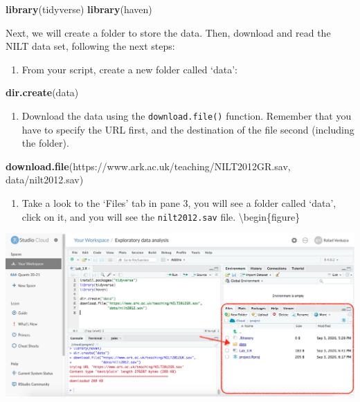 \documentclass[
]{book}
\newenvironment{Shaded}{\begin{snugshade}}{\end{snugshade}}
\newcommand{\FunctionTok}[1]{\textcolor[rgb]{0.13,0.29,0.53}{\textbf{#1}}}
\newcommand{\NormalTok}[1]{#1}
\newcommand{\StringTok}[1]{\textcolor[rgb]{0.31,0.60,0.02}{#1}}
\providecommand{\tightlist}{%
  \setlength{\itemsep}{0pt}\setlength{\parskip}{0pt}}
\begin{document}
\begin{Shaded}
\begin{Highlighting}[]
\FunctionTok{library}\NormalTok{(tidyverse)}
\FunctionTok{library}\NormalTok{(haven)}
\end{Highlighting}
\end{Shaded}

Next, we will create a folder to store the data. Then, download and read the NILT data set, following the next steps:

\begin{enumerate}
\def\labelenumi{\arabic{enumi}.}
\tightlist
\item
  From your script, create a new folder called `data':
\end{enumerate}

\begin{Shaded}
\begin{Highlighting}[]
\FunctionTok{dir.create}\NormalTok{(}\StringTok{\textquotesingle{}data\textquotesingle{}}\NormalTok{)}
\end{Highlighting}
\end{Shaded}

\begin{enumerate}
\def\labelenumi{\arabic{enumi}.}
\setcounter{enumi}{1}
\tightlist
\item
  Download the data using the \texttt{download.file()} function. Remember that you have to specify the URL first, and the destination of the file second (including the folder).
\end{enumerate}

\begin{Shaded}
\begin{Highlighting}[]
\FunctionTok{download.file}\NormalTok{(}\StringTok{\textquotesingle{}https://www.ark.ac.uk/teaching/NILT2012GR.sav\textquotesingle{}}\NormalTok{, }
              \StringTok{\textquotesingle{}data/nilt2012.sav\textquotesingle{}}\NormalTok{)}
\end{Highlighting}
\end{Shaded}

\begin{enumerate}
\def\labelenumi{\arabic{enumi}.}
\setcounter{enumi}{2}
\tightlist
\item
  Take a look to the `Files' tab in pane 3, you will see a folder called `data', click on it, and you will see the \texttt{nilt2012.sav} file.
  \textbackslash begin\{figure\}
\end{enumerate}

\includegraphics[width=1\linewidth]{./images/rstudio_cloud_files} \hfill{}
\end{document}
